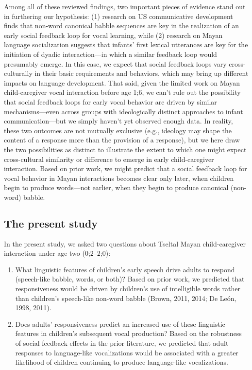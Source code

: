 \documentclass[
  man]{apa6}
\begin{document}
Among all of these reviewed findings, two important pieces of evidence stand out in furthering our hypothesis: (1) research on US communicative development finds that non-word canonical babble sequences are key in the realization of an early social feedback loop for vocal learning, while (2) research on Mayan language socialization suggests that infants' first lexical utterances are key for the initiation of dyadic interaction---in which a similar feedback loop would presumably emerge. In this case, we expect that social feedback loops vary cross-culturally in their basic requirements and behaviors, which may bring up different impacts on language development. That said, given the limited work on Mayan child-caregiver vocal interaction before age 1;6, we can't rule out the possibility that social feedback loops for early vocal behavior are driven by similar mechanisms---even across groups with ideologically distinct approaches to infant communication---but we simply haven't yet observed enough data. In reality, these two outcomes are not mutually exclusive (e.g., ideology may shape the content of a response more than the provision of a response), but we here draw the two possibilities as distinct to illustrate the extent to which one might expect cross-cultural similarity or difference to emerge in early child-caregiver interaction. Based on prior work, we might predict that a social feedback loop for vocal behavior in Mayan interactions becomes clear only later, when children begin to produce words---not earlier, when they begin to produce canonical (non-word) babble.

\hypertarget{the-present-study}{%
\subsection{The present study}\label{the-present-study}}

In the present study, we asked two questions about Tseltal Mayan child-caregiver interaction under age two (0;2--2;0):

\begin{enumerate}
\def\labelenumi{\arabic{enumi}.}
\item
  What linguistic features of children's early speech drive adults to respond (speech-like babble, words, or both)? Based on prior work, we predicted that responsiveness would be driven by children's use of intelligible words rather than children's speech-like non-word babble (Brown, 2011, 2014; De León, 1998, 2011).
\item
  Does adults' responsiveness predict an increased use of these linguistic features in children's subsequent vocal production? Based on the robustness of social feedback effects in the prior literature, we predicted that adult responses to language-like vocalizations would be associated with a greater likelihood of children continuing to produce language-like vocalizations.
\end{enumerate}
\end{document}
